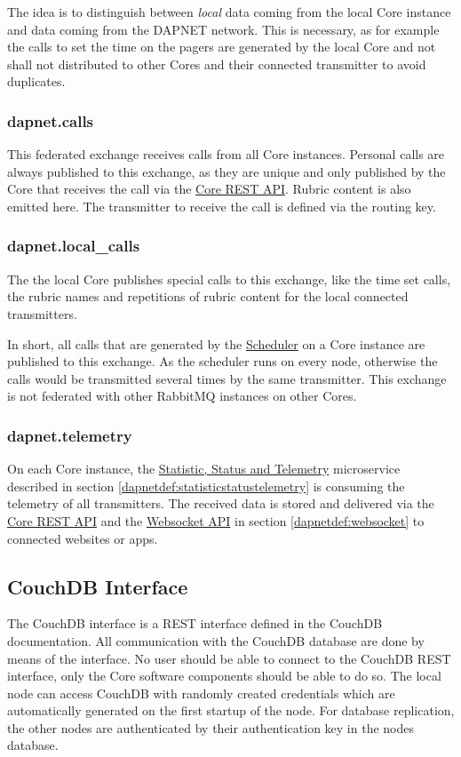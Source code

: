 The idea is to distinguish between \textit{local} data coming from the local
Core instance and data coming from the DAPNET network. This is necessary, as for
example the calls to set the time on the pagers are generated by the local Core
and not shall not distributed to other Cores and their connected transmitter to
avoid duplicates.

\subsubsection{dapnet.calls}
This federated exchange receives calls from all Core instances. Personal calls
are always published to this exchange, as they are unique and only published by
the Core that receives the call via the \hyperref[dapnetdef:corerestapi]{Core
  REST API}. Rubric content is also emitted here. The transmitter to receive the
call is defined via the routing key.

\subsubsection{dapnet.local\_calls}
The the local Core publishes special calls to this exchange, like the time set
calls, the rubric names and repetitions of rubric content for the local
connected transmitters.

In short, all calls that are generated by the
\hyperref[dapnetdef:other:scheduler]{Scheduler} on a Core instance are published
to this exchange. As the scheduler runs on every node, otherwise the calls would
be transmitted several times by the same transmitter. This exchange is not
federated with other RabbitMQ instances on other Cores.

\subsubsection{dapnet.telemetry}
On each Core instance, the
\hyperref[dapnetdef:statisticstatustelemetry]{Statistic, Status and Telemetry}
microservice described in section \ref{dapnetdef:statisticstatustelemetry} is
consuming the telemetry of all transmitters. The received data is stored and
delivered via the \hyperref[dapnetdef:corerestapi]{Core REST API} and the
\hyperref[dapnetdef:websocket]{Websocket API} in section
\ref{dapnetdef:websocket} to connected websites or apps.

\subsection{CouchDB Interface}
\label{dapnetdef:couchdbinterface}
The CouchDB interface is a REST interface defined in the CouchDB documentation.
All communication with the CouchDB database are done by means of the interface.
No user should be able to connect to the CouchDB REST interface, only the Core
software components should be able to do so. The local node can access CouchDB
with randomly created credentials which are automatically generated on the first
startup of the node. For database replication, the other nodes are authenticated
by their authentication key in the nodes database.

